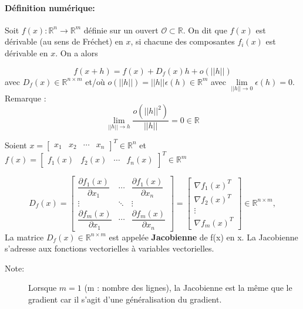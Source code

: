 \paragraph*{Définition numérique:}

Soit $f(x) : \mathbb{R}^n \to \mathbb{R}^m$ définie sur un ouvert $ \mathcal{O} \subset \mathbb{R} $. On dit que $f(x)$ est dérivable
(au sens de Fréchet) en $x$, si chacune des composantes $f_i(x)$ est dérivable  en $x$. On a alors

\begin{equation}
	f(x + h) = f(x) + D_f (x)h + o(||h||)
\end{equation}
avec $D_f (x) \in  \mathbb{R}^{n \times m} $ et/où $ o(||h||)=||h|| \epsilon(h) \in \mathbb{R}^m $ avec $\lim\limits_{||h|| \to 0} \epsilon(h) = 0 $.
Remarque :
$$
\lim\limits_{||h|| \to h} \frac{o(||h||^2)}{||h||} = 0  \in \mathbb{R}
$$

Soient 
$x = 
\begin{bmatrix}
	x_1 & x_2& \cdots & x_n
\end{bmatrix}^{T}
\in \mathbb{R}^n $ et $ 
f(x) = 
\begin{bmatrix}
	f_1(x) & f_2(x)& \cdots & f_n(x)
\end{bmatrix}^{T} \in \mathbb{R}^m
$

$$
D_f\left(x\right)={
	\begin{bmatrix}
		{\dfrac {\partial f_{1}(x)}{\partial x_{1}}}&\cdots &{\dfrac {\partial f_{1}(x)}{\partial x_{n}}}\\
		\vdots &\ddots &\vdots \\
		{\dfrac {\partial f_{m}(x)}{\partial x_{1}}}&\cdots &{\dfrac {\partial f_{m}(x)}{\partial x_{n}}}
\end{bmatrix}}
=
\begin{bmatrix}
	\nabla f_1(x)^T \\ \nabla f_2(x)^T\\ \vdots \\ \nabla f_m(x)^T
\end{bmatrix}
\in  \mathbb{R}^{n \times m},
$$
La matrice $D_f (x) \in  \mathbb{R}^{n \times m} $ est appelée \textbf{Jacobienne} de f(x) en x.
La Jacobienne s’adresse aux fonctions vectorielles à variables vectorielles.

\begin{description}
	\item[Note:] Lorsque $m=1$ (m : nombre des lignes), la Jacobienne est la même que le gradient car il s'agit d'une généralisation du gradient.
\end{description}





